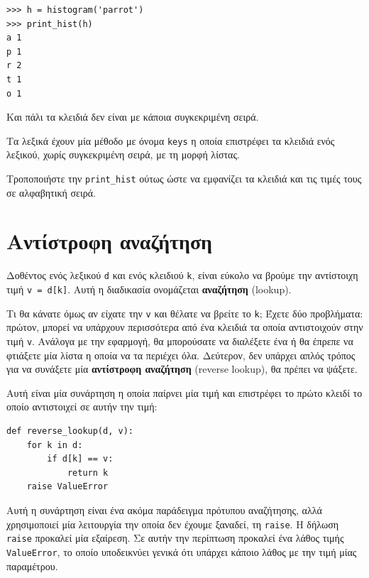 \documentclass[10pt]{book}
\begin{document}
\begin{verbatim}
>>> h = histogram('parrot')
>>> print_hist(h)
a 1
p 1
r 2
t 1
o 1
\end{verbatim}
%
Και πάλι τα κλειδιά δεν είναι με κάποια συγκεκριμένη σειρά.
\\
\begin{exercise}

Τα λεξικά έχουν μία μέθοδο με όνομα {\tt keys} η οποία επιστρέφει τα κλειδιά ενός λεξικού, χωρίς συγκεκριμένη σειρά, με τη μορφή λίστας.

Τροποποιήστε την \verb"print_hist" ούτως ώστε να εμφανίζει τα κλειδιά και τις τιμές τους σε αλφαβητική σειρά.
\end{exercise}


\section{Αντίστροφη αναζήτηση}
\label{raise}

Δοθέντος ενός λεξικού {\tt d} και ενός κλειδιού {\tt k}, είναι εύκολο να βρούμε την αντίστοιχη τιμή {\tt v = d[k]}. Αυτή η διαδικασία ονομάζεται {\bf αναζήτηση} (lookup).

Τι θα κάνατε όμως αν είχατε την {\tt v} και θέλατε να βρείτε το {\tt k}; Έχετε δύο προβλήματα: πρώτον, μπορεί να υπάρχουν περισσότερα από ένα κλειδιά τα οποία αντιστοιχούν στην τιμή {\tt v}. Ανάλογα με την εφαρμογή, θα μπορούσατε να διαλέξετε ένα ή θα έπρεπε να φτιάξετε μία λίστα η οποία να τα περιέχει όλα. Δεύτερον, δεν υπάρχει απλός τρόπος για να συνάξετε μία {\bf αντίστροφη αναζήτηση} (reverse lookup), θα πρέπει να ψάξετε.

Αυτή είναι μία συνάρτηση η οποία παίρνει μία τιμή και επιστρέφει το πρώτο κλειδί το οποίο αντιστοιχεί σε αυτήν την τιμή:

\begin{verbatim}
def reverse_lookup(d, v):
    for k in d:
        if d[k] == v:
            return k
    raise ValueError
\end{verbatim}
%
Αυτή η συνάρτηση είναι ένα ακόμα παράδειγμα πρότυπου αναζήτησης, αλλά χρησιμοποιεί μία λειτουργία την οποία δεν έχουμε ξαναδεί, τη {\tt raise}. Η δήλωση {\tt raise} προκαλεί μία εξαίρεση. Σε αυτήν την περίπτωση προκαλεί ένα λάθος τιμής {\tt ValueError}, το οποίο υποδεικνύει γενικά ότι υπάρχει κάποιο λάθος με την τιμή μίας παραμέτρου.
\end{document}
